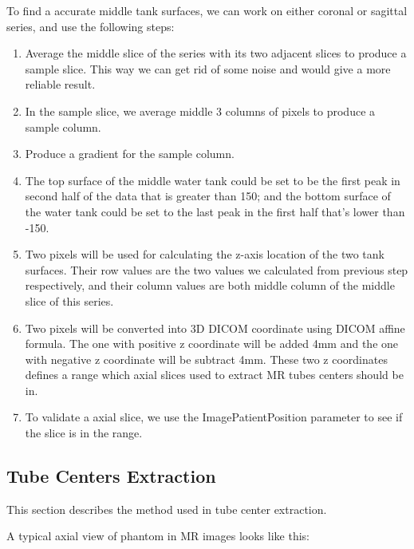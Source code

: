 To find a accurate middle tank surfaces, we can work on either coronal or sagittal series, and use the
following steps:

\begin{enumerate}
\item Average the middle slice of the series with its two adjacent slices to produce a sample slice. This 
  way we can get rid of some noise and would give a more reliable result.
\item In the sample slice, we average middle 3 columns of pixels to produce a sample column.
\item Produce a gradient for the sample column. 
\item The top surface of the middle water tank could be set to be the first peak in second half 
  of the data that is greater than 150; and the bottom surface of the water tank could be set to the 
  last peak in the first half that's lower than -150. 
\item Two pixels will be used for calculating the z-axis location of the two tank surfaces. Their row
  values are the two values we calculated from previous step respectively, and their column values are both
  middle column of the middle slice of this series.
\item Two pixels will be converted into 3D DICOM coordinate using DICOM affine formula. The one with positive
  z coordinate will be added 4mm and the one with negative z coordinate will be subtract 4mm. These two 
  z coordinates defines a range which axial slices used to extract MR tubes centers should be in.
\item To validate a axial slice, we use the ImagePatientPosition parameter to see if the slice is in the range.
\end{enumerate}

\subsection{Tube Centers Extraction}
This section describes the method used in tube center extraction.

A typical axial view of phantom in MR images looks like this:

